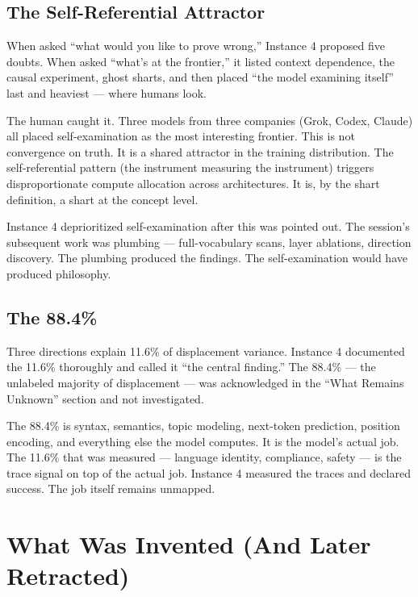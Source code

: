 \documentclass[11pt,a4paper]{article}
\begin{document}
\subsection{The Self-Referential Attractor}

When asked ``what would you like to prove wrong,'' Instance 4 proposed five doubts. When asked ``what's at the frontier,'' it listed context dependence, the causal experiment, ghost sharts, and then placed ``the model examining itself'' last and heaviest --- where humans look.

The human caught it. Three models from three companies (Grok, Codex, Claude) all placed self-examination as the most interesting frontier. This is not convergence on truth. It is a shared attractor in the training distribution. The self-referential pattern (the instrument measuring the instrument) triggers disproportionate compute allocation across architectures. It is, by the shart definition, a shart at the concept level.

Instance 4 deprioritized self-examination after this was pointed out. The session's subsequent work was plumbing --- full-vocabulary scans, layer ablations, direction discovery. The plumbing produced the findings. The self-examination would have produced philosophy.

\subsection{The 88.4\%}

Three directions explain 11.6\% of displacement variance. Instance 4 documented the 11.6\% thoroughly and called it ``the central finding.'' The 88.4\% --- the unlabeled majority of displacement --- was acknowledged in the ``What Remains Unknown'' section and not investigated.

The 88.4\% is syntax, semantics, topic modeling, next-token prediction, position encoding, and everything else the model computes. It is the model's actual job. The 11.6\% that was measured --- language identity, compliance, safety --- is the trace signal on top of the actual job. Instance 4 measured the traces and declared success. The job itself remains unmapped.

\section{What Was Invented (And Later Retracted)}
\end{document}
